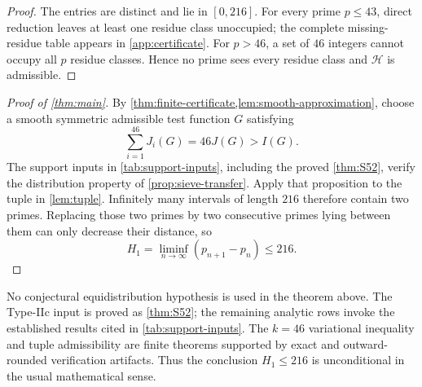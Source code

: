 \begin{proof}
The entries are distinct and lie in $[0,216]$.  For every prime
$p\le43$, direct reduction leaves at least one residue class unoccupied;
the complete missing-residue table appears in \cref{app:certificate}.
For $p>46$, a set of $46$ integers cannot occupy all $p$ residue classes.
Hence no prime sees every residue class and $\mathcal H$ is admissible.
\end{proof}

\begin{proof}[Proof of \cref{thm:main}]
By \cref{thm:finite-certificate,lem:smooth-approximation}, choose a smooth
symmetric admissible test function $G$ satisfying
\[
 \sum_{i=1}^{46}J_i(G)=46J(G)>I(G).
\]
The support inputs in \cref{tab:support-inputs}, including the proved
\cref{thm:S52}, verify the distribution property of
\cref{prop:sieve-transfer}.  Apply that proposition to the
tuple in \cref{lem:tuple}.  Infinitely many intervals of length $216$
therefore contain two primes.  Replacing those two primes by two consecutive
primes lying between them can only decrease their distance, so
\[
 H_1=\liminf_{n\to\infty}(p_{n+1}-p_n)\le216.
\]
\end{proof}

\begin{remark}\label{rem:verification-status}
No conjectural equidistribution hypothesis is used in the theorem above.
The Type-IIc input is proved as \cref{thm:S52}; the remaining analytic rows
invoke the established results cited in \cref{tab:support-inputs}.  The
$k=46$ variational inequality and tuple admissibility are finite theorems
supported by exact and outward-rounded verification artifacts.  Thus the
conclusion $H_1\le216$ is unconditional in the usual mathematical sense.
\end{remark}
